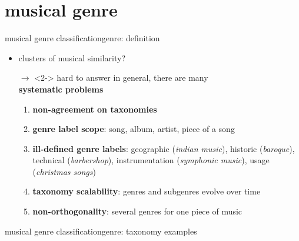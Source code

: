     \section[genre]{musical genre}
        \begin{frame}{musical genre classification}{genre: definition}

            \begin{itemize}
                \item   clusters of musical similarity?
                \item[$\rightarrow$]<2->             hard to answer in general, there are many\\ \textbf{systematic problems}
                \smallskip
                    \begin{enumerate}
                        \item<2->	\textbf{non-agreement on taxonomies}
                        \item<2->   \textbf{genre label scope}: song, album, artist, piece of a song
                        \item<2->	\textbf{ill-defined genre labels}: geographic (\textit{indian music}), historic (\textit{baroque}), technical (\textit{barbershop}), instrumentation (\textit{symphonic music}), usage (\textit{christmas songs})
                        \item<2->	\textbf{taxonomy scalability}: genres and subgenres evolve over time
                        \item<2->	\textbf{non-orthogonality}: several genres for one piece of music
                    \end{enumerate}

            \end{itemize}
            
        \end{frame}
        \begin{frame}{musical genre classification}{genre: taxonomy examples}
                \vspace{-20mm}
                \begin{center}
                \scalebox{.6}
                {
                    
                }
                \end{center}
        \end{frame}

